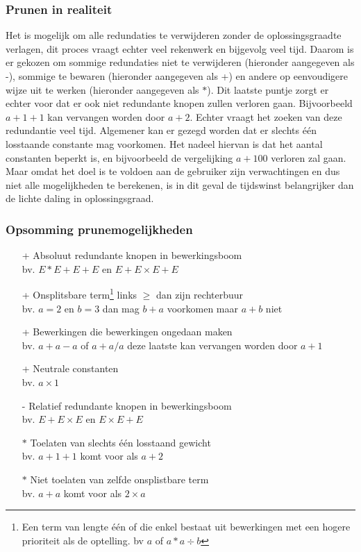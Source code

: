 \documentclass[Main.tex]{subfiles}
\begin{document}
\subsubsection*{Prunen in realiteit}
Het is mogelijk om alle redundaties te verwijderen zonder de oplossingsgraad\footnotemark[\ref{note:oplossingsgraad}]
te verlagen, dit proces vraagt echter veel rekenwerk en bijgevolg veel tijd. Daarom is er gekozen om sommige redundaties niet te verwijderen (hieronder aangegeven als -), sommige te bewaren (hieronder aangegeven als +) en andere op eenvoudigere wijze uit te werken (hieronder aangegeven als $\ast$). Dit laatste puntje zorgt er echter voor dat er ook niet redundante knopen zullen verloren gaan. Bijvoorbeeld $a+1+1$ kan vervangen worden door $a+2$. Echter vraagt het zoeken van deze redundantie veel tijd. Algemener kan er gezegd worden dat er slechts één losstaande constante mag voorkomen. Het nadeel hiervan is dat het aantal constanten beperkt is, en bijvoorbeeld de vergelijking $a+100$ verloren zal gaan. Maar omdat het doel is te voldoen aan de gebruiker zijn verwachtingen en dus niet alle mogelijkheden te berekenen, is in dit geval de tijdswinst belangrijker dan de lichte daling in oplossingsgraad\footnotemark[\ref{note:oplossingsgraad}].
\subsubsection*{Opsomming prunemogelijkheden}
\begin{itemize}
\item[+] Absoluut redundante knopen in bewerkingsboom\\
bv. $E \ast E+E+E$ en $E+E \times E+E$
\item[+] Onsplitsbare term\footnote{\label{note:onsplitsbaar}Een term van lengte \'e\'en of die enkel bestaat uit bewerkingen met een hogere prioriteit als de optelling. bv $a$ of $a \ast a \div b$}
links $\geq$ dan zijn rechterbuur\\
	bv. $a=2$ en $b=3$ dan mag $b+a$ voorkomen maar $a+b$ niet
\item[+] Bewerkingen die bewerkingen ongedaan maken\\
	bv. $a+a-a$ of $a+a/a$ deze laatste kan vervangen worden door $a+1$
\item[+] Neutrale constanten\\
	bv. $a \times 1$
\item[-] Relatief redundante knopen in bewerkingsboom\\
	bv. $E+E \times E$ en $E \times E+E$
\item[$\ast$] Toelaten van slechts één losstaand gewicht\\
	bv. $a+1+1$ komt voor als $a+2$
\item[$\ast$] Niet toelaten van zelfde onsplistbare term\footnotemark[\ref{note:onsplitsbaar}]\\
	bv. $a+a$ komt voor als $2 \times a$
\end{itemize}
\end{document}
